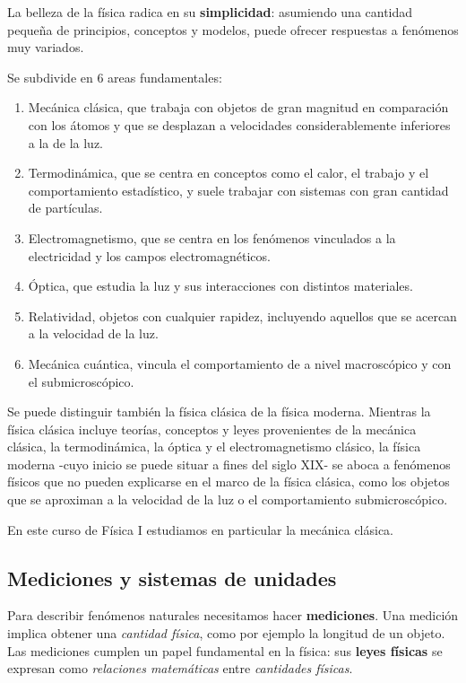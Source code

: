 La belleza de la física radica en su \textbf{simplicidad}:
asumiendo una cantidad pequeña de principios, conceptos y modelos,
puede ofrecer respuestas a fenómenos muy variados.

Se subdivide en 6 areas fundamentales:
\begin{enumerate}
    \item Mecánica clásica,
          que trabaja con objetos de gran magnitud en comparación con los átomos
          y que se desplazan a velocidades considerablemente inferiores a la de la luz.
    \item Termodinámica,
          que se centra en conceptos como el calor, el trabajo y el comportamiento
          estadístico, y suele trabajar con sistemas con gran cantidad de partículas.
    \item Electromagnetismo,
          que se centra en los fenómenos vinculados a la electricidad
          y los campos electromagnéticos.
    \item Óptica,
          que estudia la luz y sus interacciones con distintos materiales.
    \item Relatividad,
          objetos con cualquier rapidez,
          incluyendo aquellos que se acercan a la velocidad de la luz.
    \item Mecánica cuántica,
          vincula el comportamiento de a nivel macroscópico y con el submicroscópico.
\end{enumerate}

Se puede distinguir también la física clásica de la física moderna.
Mientras la física clásica incluye teorías, conceptos y leyes provenientes
de la mecánica clásica, la termodinámica,
la óptica y el electromagnetismo clásico,
la física moderna
-cuyo inicio se puede situar a fines del siglo XIX-
se aboca a fenómenos físicos que no pueden explicarse en el marco de la física clásica,
como los objetos que se aproximan a la velocidad de la luz
o el comportamiento submicroscópico.

En este curso de Física I estudiamos en particular la mecánica clásica.

\subsection{Mediciones y sistemas de unidades}

Para describir fenómenos naturales necesitamos hacer \textbf{mediciones}.
Una medición implica obtener una \textit{cantidad física},
como por ejemplo la longitud de un objeto.
Las mediciones cumplen un papel fundamental en la física:
sus \textbf{leyes físicas} se expresan como \textit{relaciones matemáticas}
entre \textit{cantidades físicas}.

